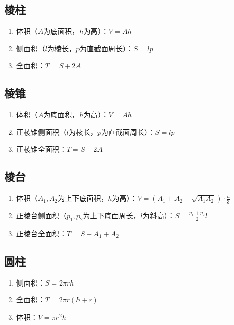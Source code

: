 \begin{spacing}{0.1}
\subsection*{棱柱}
\begin{spacing}{0.1}
	\begin{enumerate}
		\item 体积（$A$为底面积，$h$为高）：$\displaystyle V=Ah$
		\item 侧面积（$l$为棱长，$p$为直截面周长）：$\displaystyle S=lp$
		\item 全面积：$\displaystyle T=S+2A$
	\end{enumerate}
\end{spacing}
\subsection*{棱锥}
\begin{spacing}{0.1}
	\begin{enumerate}
		\item 体积（$A$为底面积，$h$为高）：$\displaystyle V=Ah$
		\item 正棱锥侧面积（$l$为棱长，$p$为直截面周长）：$\displaystyle S=lp$
		\item 正棱锥全面积：$\displaystyle T=S+2A$
	\end{enumerate}
\end{spacing}
\subsection*{棱台}
\begin{spacing}{0.1}
	\begin{enumerate}
		\item 体积（$A_1,A_2$为上下底面积，$h$为高）：$\displaystyle V=(A_1+A_2+\sqrt{A_1A_2}) \cdot \frac{h}{3}$
		\item 正棱台侧面积（$p_1,p_2$为上下底面周长，$l$为斜高）：$\displaystyle S=\frac{p_1+p_2}{2}l$
		\item 正棱台全面积：$\displaystyle T=S+A_1+A_2$
	\end{enumerate}
\end{spacing}
\subsection*{圆柱}
\begin{spacing}{0.1}
	\begin{enumerate}
		\item 侧面积：$\displaystyle S=2\pi rh$
		\item 全面积：$\displaystyle T=2\pi r(h+r)$
		\item 体积：$\displaystyle V=\pi r^2h$
	\end{enumerate}
\end{spacing}

\end{spacing}
